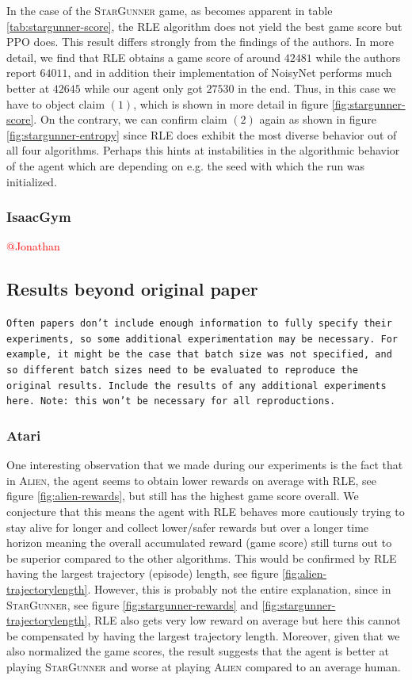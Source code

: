 \documentclass[10pt]{article} %
\begin{document}
\noindent In the case of the \textsc{StarGunner} game, as becomes apparent in table \ref{tab:stargunner-score}, the RLE algorithm does not yield the best game score but PPO does. This result differs strongly from the findings of the authors. In more detail, we find that RLE obtains a game score of around $42481$ while the authors report $64011$, and in addition their implementation of NoisyNet performs much better at $42645$ while our agent only got $27530$ in the end. Thus, in this case we have to object claim $(1)$, which is shown in more detail in figure \ref{fig:stargunner-score}. On the contrary, we can confirm claim $(2)$ again as shown in figure \ref{fig:stargunner-entropy} since RLE does exhibit the most diverse behavior out of all four algorithms. Perhaps this hints at instabilities in the algorithmic behavior of the agent which are depending on e.g. the seed with which the run was initialized.

\subsubsection{IsaacGym}
\textcolor{red}{@Jonathan}


\subsection{Results beyond original paper}
\texttt{Often papers don't include enough information to fully specify their experiments, so some additional experimentation may be necessary. For example, it might be the case that batch size was not specified, and so different batch sizes need to be evaluated to reproduce the original results. Include the results of any additional experiments here. Note: this won't be necessary for all reproductions.}

\subsubsection{Atari}

\noindent One interesting observation that we made during our experiments is the fact that in \textsc{Alien}, the agent seems to obtain lower rewards on average with RLE, see figure \ref{fig:alien-rewards}, but still has the highest game score overall. We conjecture that this means the agent with RLE behaves more cautiously trying to stay alive for longer and collect lower/safer rewards but over a longer time horizon meaning the overall accumulated reward (game score) still turns out to be superior compared to the other algorithms. This would be confirmed by RLE having the largest trajectory (episode) length, see figure \ref{fig:alien-trajectorylength}. However, this is probably not the entire explanation, since in \textsc{StarGunner}, see figure \ref{fig:stargunner-rewards} and \ref{fig:stargunner-trajectorylength}, RLE also gets very low reward on average but here this cannot be compensated by having the largest trajectory length. Moreover, given that we also normalized the game scores, the result suggests that the agent is better at playing \textsc{StarGunner} and worse at playing \textsc{Alien} compared to an average human.
\end{document}
